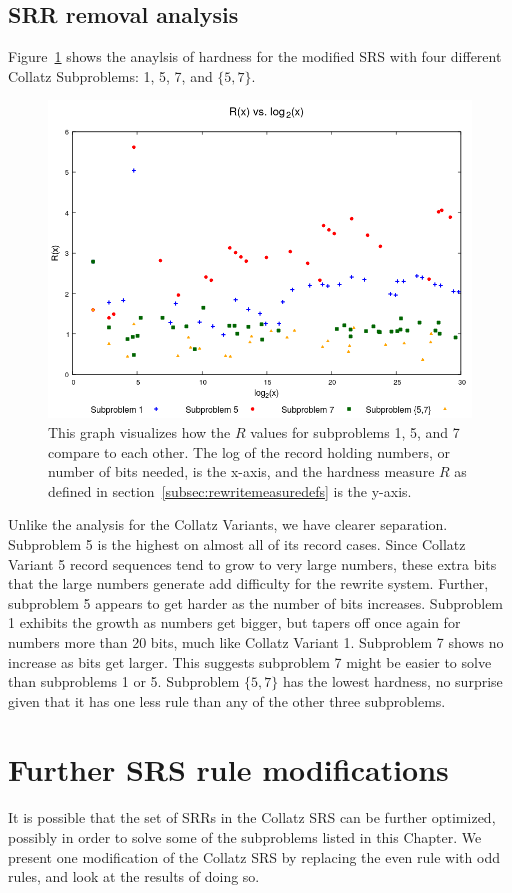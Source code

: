 \subsection{SRR removal analysis} \label{subsec:rewritehardness}
Figure~\ref{fig:rvslog} shows the anaylsis of hardness for the modified SRS with four different Collatz Subproblems: 1, 5, 7, and $\{5,7\}$. 
\begin{figure}
    \centering
    \includegraphics[scale=0.75]{ModAvoidanceAnalysisPics/R_vs_log.png}
    \caption{This graph visualizes how the $R$ values for subproblems 1, 5, and 7 compare to each other. The log of the record holding numbers, or number of bits needed, is the x-axis, and the hardness measure $R$ as defined in section~\ref{subsec:rewritemeasuredefs} is the y-axis.}
    \label{fig:rvslog}
\end{figure}
Unlike the analysis for the Collatz Variants, we have clearer separation. Subproblem 5 is the highest on almost all of its record cases. Since Collatz Variant 5 record sequences tend to grow to very large numbers, these extra bits that the large numbers generate add difficulty for the rewrite system. Further, subproblem 5 appears to get harder as the number of bits increases. Subproblem 1 exhibits the growth as numbers get bigger, but tapers off once again for numbers more than 20 bits, much like Collatz Variant 1. Subproblem 7 shows no increase as bits get larger. This suggests subproblem 7 might be easier to solve than subproblems 1 or 5. Subproblem $\{5,7\}$ has the lowest hardness, no surprise given that it has one less rule than any of the other three subproblems.
\section{Further SRS rule modifications}\label{subsec:srsrulemod}
It is possible that the set of SRRs in the Collatz SRS can be further optimized, possibly in order to solve some of the subproblems listed in this Chapter. We present one modification of the Collatz SRS by replacing the even rule with odd rules, and look at the results of doing so.
